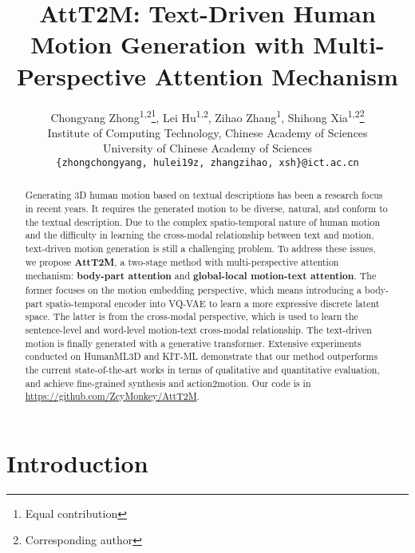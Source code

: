 \documentclass[10pt,twocolumn,letterpaper]{article}
\begin{document}
\title{AttT2M: Text-Driven Human Motion Generation with Multi-Perspective Attention Mechanism}

\author{Chongyang Zhong\textsuperscript{1,2}\thanks{Equal contribution}, Lei Hu\textsuperscript{1,2}\footnotemark[1], Zihao Zhang\textsuperscript{1}\footnotemark[1], Shihong Xia\textsuperscript{1,2}\thanks{Corresponding author}\\ 
Institute of Computing Technology, Chinese Academy of Sciences\\
University of Chinese Academy of Sciences\\
{\tt\small \{zhongchongyang, hulei19z, zhangzihao, xsh\}@ict.ac.cn}
}

\maketitle
\ificcvfinal\thispagestyle{empty}\fi

\begin{abstract}
Generating 3D human motion based on textual descriptions has been a research focus in recent years. It requires the generated motion to be diverse, natural, and conform to the textual description. Due to the complex spatio-temporal nature of human motion and the difficulty in learning the cross-modal relationship between text and motion, text-driven motion generation is still a challenging problem. To address these issues, we propose \textbf{AttT2M}, a two-stage method with multi-perspective attention mechanism: \textbf{body-part attention} and \textbf{global-local motion-text attention}. The former focuses on the motion embedding perspective, which means introducing a body-part spatio-temporal encoder into VQ-VAE to learn a more expressive discrete latent space. The latter is from the cross-modal perspective, which is used to learn the sentence-level and word-level motion-text cross-modal relationship. The text-driven motion is finally generated with a generative transformer. Extensive experiments conducted on HumanML3D and KIT-ML demonstrate that our method outperforms the current state-of-the-art works in terms of qualitative and quantitative evaluation, and achieve fine-grained synthesis and action2motion. Our code is in \href{https://github.com/ZcyMonkey/AttT2M}{https://github.com/ZcyMonkey/AttT2M}.
\end{abstract}

\section{Introduction}
\label{sec:intro}
\end{document}
